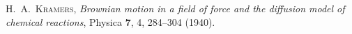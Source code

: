 \documentclass{article}
\begin{document}

\begin{thebibliography}{9}

 \textsc{H.~A.~Kramers}, \textit{Brownian motion in a field
of force and the diffusion model of chemical reactions}, Physica \textbf{7}, 4,
284--304 (1940).


\end{thebibliography}
\end{document}
